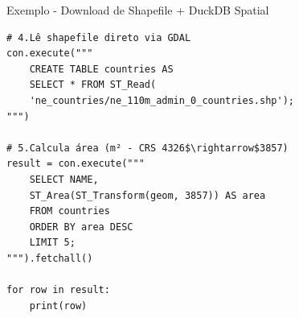 \documentclass{beamer}
\begin{document}
\begin{frame}[fragile]{Exemplo - Download de Shapefile + DuckDB Spatial}
    
    \begin{verbatim}
# 4.Lê shapefile direto via GDAL
con.execute("""
    CREATE TABLE countries AS
    SELECT * FROM ST_Read(
    'ne_countries/ne_110m_admin_0_countries.shp');
""")

# 5.Calcula área (m² - CRS 4326$\rightarrow$3857)
result = con.execute("""
    SELECT NAME,
    ST_Area(ST_Transform(geom, 3857)) AS area
    FROM countries
    ORDER BY area DESC
    LIMIT 5;
""").fetchall()

for row in result:
    print(row)
\end{verbatim}

\end{frame}
\end{document}
